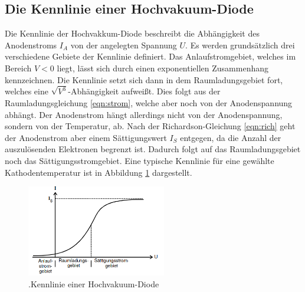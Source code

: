 \subsection{Die Kennlinie einer Hochvakuum-Diode}
Die Kennlinie der Hochvakkum-Diode beschreibt die Abhängigkeit des Anodenstroms $I_A$ von der angelegten Spannung $U$.
Es werden grundsätzlich drei verschiedene Gebiete der Kennlinie definiert.
Das Anlaufstromgebiet, welches im Bereich $V < 0$ liegt, lässt sich durch einen exponentiellen Zusammenhang kennzeichnen.
Die Kennlinie setzt sich dann in dem Raumladungsgebiet fort, welches eine $\sqrt{V^{3}}$-Abhängigkeit aufwei\ss{}t.
Dies folgt aus der Raumladungsgleichung \ref{eqn:strom}, welche aber noch von der Anodenspannung abhängt.
Der Anodenstrom hängt allerdings nicht von der Anodenspannung, sondern von der Temperatur, ab.
Nach der Richardson-Gleichung \ref{eqn:rich} geht der Anodenstrom aber einem Sättigungswert $I_S$ entgegen, da die Anzahl der auszulösenden Elektronen begrenzt ist.
Dadurch folgt auf das Raumladungsgebiet noch das Sättigungsstromgebiet.
Eine typische Kennlinie für eine gewählte Kathodentemperatur ist in Abbildung \ref{fig:kennlinie} dargestellt.

\begin{figure}[h]
    \centering
    \includegraphics[height=4cm]{Theorie/Kennlinie.png}
    \caption{.Kennlinie einer Hochvakuum-Diode}
    \label{fig:kennlinie}
\end{figure}
